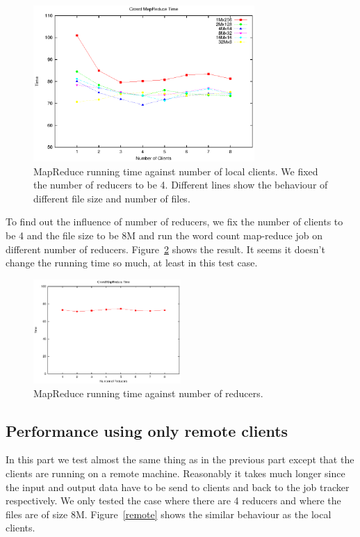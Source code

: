 \documentclass{article} %
\begin{document}
\begin{figure}[h]
  \centering
    \includegraphics[width=0.75\textwidth]{local}
    \caption{MapReduce running time against number of local clients. We fixed 
    the number of reducers to be 4. Different lines show the behaviour of 
  different file size and number of files.}
    \label{local}
\end{figure}

To find out the influence of number of reducers, we fix the number of clients
to be 4 and the file size to be 8M and run the word count map-reduce job on 
different number of reducers. Figure~\ref{reducer} shows the result. It seems
it doesn't change the running time so much, at least in this test case.

\begin{figure}[h]
  \centering
    \includegraphics[width=0.5\textwidth]{reducer}
    \caption{MapReduce running time against number of reducers.}
    \label{reducer}
\end{figure}

\subsection{Performance using only remote clients}
In this part we test almost the same thing as in the previous part except that 
the clients are running on a remote machine. Reasonably it takes much longer
since the input and output data have to be send to clients and back to the job
tracker respectively. We only tested the case where there are 4 reducers and 
where the files are of size 8M. Figure~\ref{remote} shows the similar behaviour
as the local clients.
\end{document}
